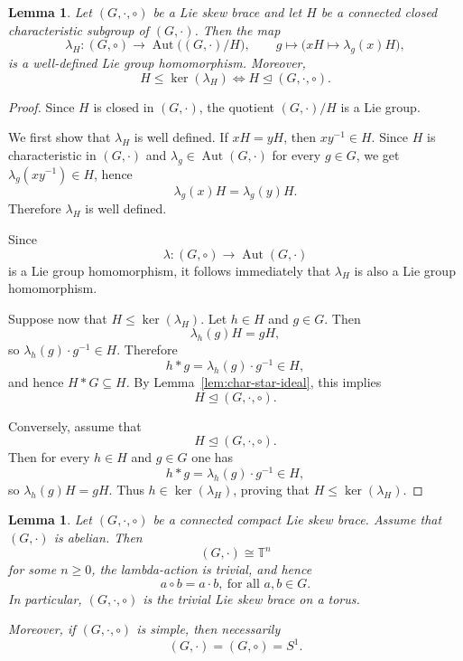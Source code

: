 \documentclass[reqno]{amsart}
\newtheorem{lemma}[theorem]{Lemma}
\DeclareMathOperator{\Aut}{Aut}
\begin{document}
\begin{lemma}\label{FundLemma}
Let $(G,\cdot,\circ)$ be a Lie skew brace and let $H$ be a connected closed
characteristic subgroup of $(G,\cdot)$. Then the map
\[
\lambda_H:(G,\circ)\longrightarrow \Aut\bigl((G,\cdot)/H\bigr),\qquad
g\longmapsto \bigl(xH\mapsto \lambda_g(x)H\bigr),
\]
is a well-defined Lie group homomorphism. Moreover,
\[
H\leq \ker(\lambda_H)
\iff
H\trianglelefteq (G,\cdot,\circ).
\]
\end{lemma}

\begin{proof}
Since $H$ is closed in $(G,\cdot)$, the quotient $(G,\cdot)/H$ is a Lie group.

We first show that $\lambda_H$ is well defined. If $xH=yH$, then
$xy^{-1}\in H$. Since $H$ is characteristic in $(G,\cdot)$ and
$\lambda_g\in\Aut(G,\cdot)$ for every $g\in G$, we get
$\lambda_g(xy^{-1})\in H$, hence
\[
\lambda_g(x)H=\lambda_g(y)H.
\]
Therefore $\lambda_H$ is well defined.

Since
\[
\lambda:(G,\circ)\to\Aut(G,\cdot)
\]
is a Lie group homomorphism, it follows immediately that $\lambda_H$ is also a
Lie group homomorphism.

Suppose now that $H\leq \ker(\lambda_H)$. Let $h\in H$ and $g\in G$. Then
\[
\lambda_h(g)H=gH,
\]
so $\lambda_h(g)\cdot g^{-1}\in H$. Therefore
\[
h*g=\lambda_h(g)\cdot g^{-1}\in H,
\]
and hence $H*G\subseteq H$. By Lemma~\ref{lem:char-star-ideal}, this implies
\[
H\trianglelefteq (G,\cdot,\circ).
\]

Conversely, assume that
\[
H\trianglelefteq (G,\cdot,\circ).
\]
Then for every $h\in H$ and $g\in G$ one has
\[
h*g=\lambda_h(g)\cdot g^{-1}\in H,
\]
so $\lambda_h(g)H=gH$. Thus $h\in\ker(\lambda_H)$, proving that
$H\leq \ker(\lambda_H)$.
\end{proof}

\begin{lemma}\label{lem:compact-abelian-trivial}
Let $(G,\cdot,\circ)$ be a connected compact Lie skew brace. Assume that
$(G,\cdot)$ is abelian. Then
\[
(G,\cdot)\cong \mathbb{T}^n
\]
for some $n\ge 0$, the lambda-action is trivial, and hence
\[
a\circ b=a\cdot b,\  \text{for all }a,b\in G.
\]
In particular, $(G,\cdot,\circ)$ is the trivial Lie skew brace on a torus.

Moreover, if $(G,\cdot,\circ)$ is simple, then necessarily
\[
(G,\cdot)=(G,\circ)=S^1.
\]
\end{lemma}
\end{document}
